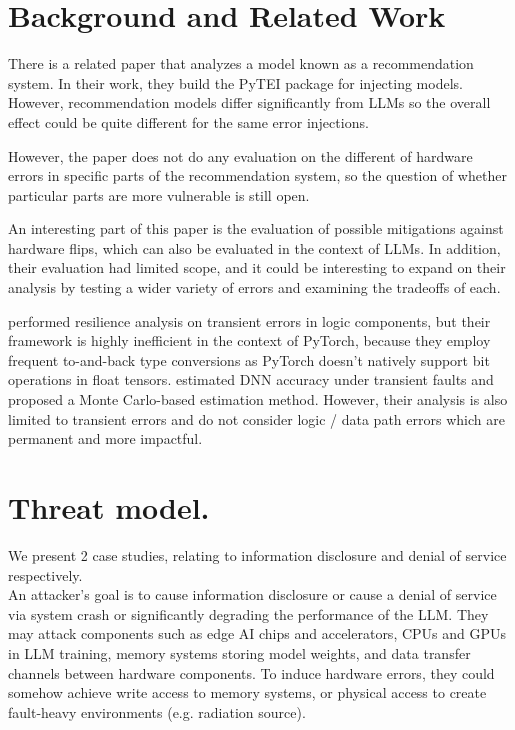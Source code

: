 \section{Background and Related Work}
\label{sec:relwork}
There is a related paper \cite{Ma23} that analyzes a model known as a recommendation system. In their work, they build the PyTEI package for injecting models. However, recommendation models differ significantly from LLMs so the overall effect could be quite different for the same error injections.

However, the paper does not do any evaluation on the different of hardware errors in specific parts of the recommendation system, so the question of whether particular parts are more vulnerable is still open.

An interesting part of this paper is the evaluation of possible mitigations against hardware flips, which can also be evaluated in the context of LLMs. In addition, their evaluation had limited scope, and it could be interesting to expand on their analysis by testing a wider variety of errors and examining the tradeoffs of each.

\cite{fidelity} performed resilience analysis on transient errors in logic components, but their framework is highly inefficient in the context of PyTorch, because they employ frequent to-and-back type conversions as PyTorch doesn't natively support bit operations in float tensors. \cite{thales} estimated DNN accuracy under transient faults and proposed a Monte Carlo-based estimation method. However, their analysis is also limited to transient errors and do not consider logic / data path errors which are permanent and more impactful.


\section{Threat model.}
We present 2 case studies, relating to information disclosure and denial of service respectively. \\

An attacker's goal is to cause information disclosure or cause a denial of service via system crash or significantly degrading the performance of the LLM. They may attack components such as edge AI chips and accelerators, CPUs and GPUs in LLM training, memory systems storing model weights, and data transfer channels between hardware components. To induce hardware errors, they could somehow achieve write access to memory systems, or physical access to create fault-heavy environments (e.g. radiation source). 

